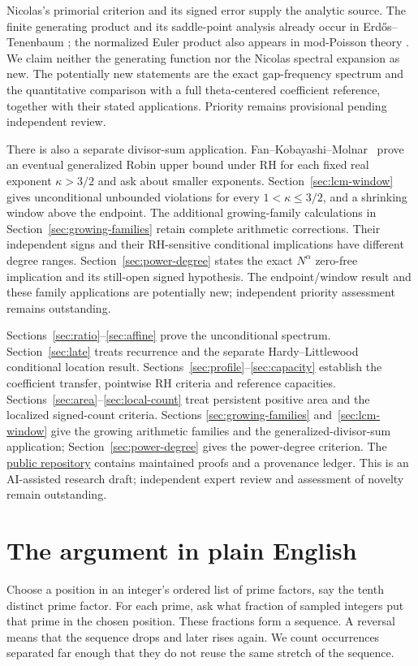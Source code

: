 \documentclass[11pt]{article}
\theoremstyle{definition}
\begin{document}
Nicolas's primorial criterion and its signed error
\cite{Nicolas1983,Nicolas2012} supply the analytic source.
The finite generating product and its saddle-point analysis already
occur in Erd\H{o}s--Tenenbaum \cite{ET}; the normalized Euler product
also appears in mod-Poisson theory \cite{KN,FMN}. We claim neither
the generating function nor the Nicolas spectral expansion as new.
The potentially new statements are the exact gap-frequency spectrum
and the quantitative comparison with a full theta-centered
coefficient reference, together with their stated applications.
Priority remains provisional pending independent review.

There is also a separate divisor-sum application.
Fan--Kobayashi--Molnar~\cite[Theorem~6.1 and \S8]{FKM}
prove an eventual generalized Robin upper bound under RH for each
fixed real exponent $\kappa>3/2$ and ask about smaller exponents.
Section~\ref{sec:lcm-window} gives unconditional unbounded violations
for every $1<\kappa\le3/2$, and a shrinking window above the endpoint.
The additional growing-family calculations in
Section~\ref{sec:growing-families} retain complete arithmetic
corrections. Their independent signs and their RH-sensitive
conditional implications have different degree ranges.
Section~\ref{sec:power-degree} states the exact $N^\alpha$
zero-free implication and its still-open signed hypothesis.
The endpoint/window result and these family applications are
potentially new; independent priority assessment remains outstanding.

Sections~\ref{sec:ratio}--\ref{sec:affine} prove the unconditional
spectrum. Section~\ref{sec:late} treats recurrence and the separate
Hardy--Littlewood conditional location result.
Sections~\ref{sec:profile}--\ref{sec:capacity} establish the coefficient
transfer, pointwise RH criteria and reference capacities.
Sections~\ref{sec:area}--\ref{sec:local-count} treat persistent positive
area and the localized signed-count criteria. Sections
\ref{sec:growing-families} and~\ref{sec:lcm-window} give the growing
arithmetic families and the generalized-divisor-sum application;
Section~\ref{sec:power-degree} gives the power-degree criterion. The
\href{https://github.com/kimihiro64/prime-factor-oscillations}{public repository}
contains maintained proofs and a provenance ledger. This is an
AI-assisted research draft; independent expert review and assessment
of novelty remain outstanding.

\section{The argument in plain English}\label{sec:plain}
Choose a position in an integer's ordered list of prime factors,
say the tenth distinct prime factor. For each prime, ask what fraction
of sampled integers put that prime in the chosen position. These
fractions form a sequence. A reversal means that the sequence drops
and later rises again. We count occurrences separated far enough
that they do not reuse the same stretch of the sequence.
\end{document}
